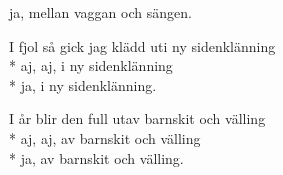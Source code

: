 \begin{SongText}
\begin{SongVerse}
        ja, mellan vaggan och sängen.
    \end{SongVerse}
    \begin{SongVerse}
        I fjol så gick jag klädd uti ny sidenklänning\\*%
        aj, aj, i ny sidenklänning\\*%
        ja, i ny sidenklänning.
    \end{SongVerse}
    \begin{SongVerse}
        I år blir den full utav barnskit och välling\\*%
        aj, aj, av barnskit och välling\\*%
        ja, av barnskit och välling.
    \end{SongVerse}
\end{SongText}
